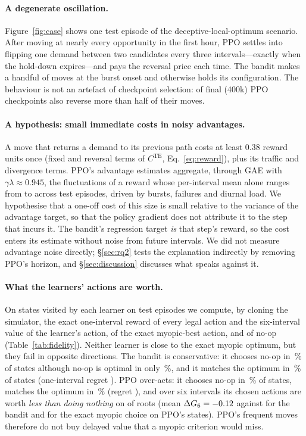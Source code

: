 \paragraph{A degenerate oscillation.}
Figure~\ref{fig:case} shows one test episode of the deceptive-local-optimum
scenario. After moving at nearly every opportunity in the first hour, PPO
settles into flipping one demand between two candidates every three
intervals---exactly when the hold-down expires---and pays the reversal price
each time. The bandit makes a handful of moves at the burst onset and
otherwise holds its configuration. The behaviour is not an artefact of checkpoint selection:
\PPOFinalFlappingRoots{} of \PPOFinalRoots{} final (400k) PPO checkpoints also
reverse more than half of their moves.

\paragraph{A hypothesis: small immediate costs in noisy advantages.}
A move that returns a demand to its previous path costs at least $0.38$
reward units once (fixed and reversal terms of $C^{\mathrm{TE}}$,
Eq.~\ref{eq:reward}), plus its traffic and divergence terms. PPO's advantage
estimates aggregate, through GAE with $\gamma\lambda\approx0.945$, the
fluctuations of a reward whose per-interval mean alone ranges from
\PerIntervalMin{} to \PerIntervalMax{} across test episodes, driven by bursts,
failures and diurnal load. We hypothesise that a one-off cost of this size is
small relative to the variance of the advantage target, so that the policy
gradient does not attribute it to the step that incurs it. The bandit's
regression target \emph{is} that step's reward, so the cost enters its
estimate without noise from future intervals. We did not measure advantage
noise directly; \S\ref{sec:rq2} tests the explanation indirectly by
removing PPO's horizon, and \S\ref{sec:discussion} discusses what speaks
against it.

\paragraph{What the learners' actions are worth.}
On states visited by each learner on test episodes we compute, by cloning the
simulator, the exact one-interval reward of every legal action and the
six-interval value of the learner's action, of the exact myopic-best action,
and of no-op (Table~\ref{tab:fidelity}). Neither learner is close to the exact myopic
optimum, but they fail in opposite directions. The bandit is conservative: it
chooses no-op in \FidBanditNoopPolicy\,\% of states although no-op is optimal
in only \FidBanditNoopOptimal\,\%, and it matches the optimum in
\FidBanditTopOne\,\% of states (one-interval regret \FidBanditRegret). PPO
over-acts: it chooses no-op in \FidPPONoopPolicy\,\% of states, matches the
optimum in \FidPPOTopOne\,\% (regret \FidPPORegret), and over six intervals
its chosen actions are worth \emph{less than doing nothing} on
\FidPPONegRoots{} of \FidPPORoots{} roots (mean $\Delta G_6=-0.12$
against \FidBanditGSix{} for the bandit and \FidPPOGSixMyopic{} for the exact
myopic choice on PPO's states). PPO's frequent moves therefore do not buy
delayed value that a myopic criterion would miss.

